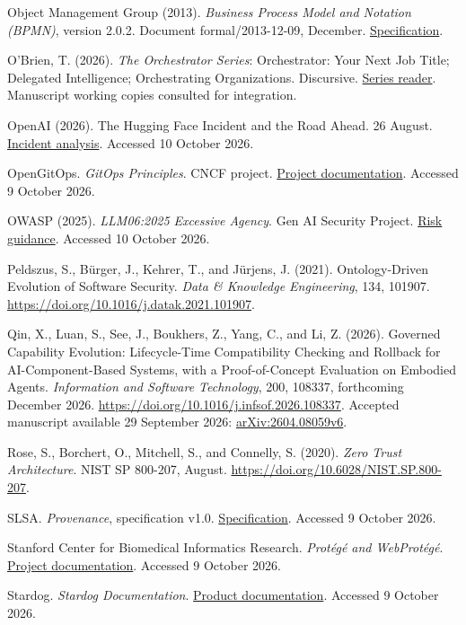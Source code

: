 \documentclass[preprint,12pt,authoryear]{elsarticle}
\begin{document}
Object Management Group (2013). \emph{Business Process Model and
Notation (BPMN)}, version 2.0.2. Document formal/2013-12-09, December.
\href{https://www.omg.org/spec/BPMN/2.0.2/PDF}{Specification}.

O'Brien, T. (2026). \emph{The Orchestrator Series}: Orchestrator: Your
Next Job Title; Delegated Intelligence; Orchestrating Organizations.
Discursive. \href{https://readorchestrator.com}{Series reader}.
Manuscript working copies consulted for integration.

OpenAI (2026). The Hugging Face Incident and the Road Ahead. 26 August.
\href{https://openai.com/index/hugging-face-incident-and-the-road-ahead/}{Incident
analysis}. Accessed 10 October 2026.

OpenGitOps. \emph{GitOps Principles}. CNCF project.
\href{https://opengitops.dev/}{Project documentation}. Accessed 9
October 2026.

OWASP (2025). \emph{LLM06:2025 Excessive Agency}. Gen AI Security
Project.
\href{https://genai.owasp.org/llmrisk/llm062025-excessive-agency/}{Risk
guidance}. Accessed 10 October 2026.

Peldszus, S., Bürger, J., Kehrer, T., and Jürjens, J. (2021).
Ontology-Driven Evolution of Software Security. \emph{Data \& Knowledge
Engineering}, 134, 101907.
\url{https://doi.org/10.1016/j.datak.2021.101907}.

Qin, X., Luan, S., See, J., Boukhers, Z., Yang, C., and Li, Z. (2026).
Governed Capability Evolution: Lifecycle-Time Compatibility Checking and
Rollback for AI-Component-Based Systems, with a Proof-of-Concept
Evaluation on Embodied Agents. \emph{Information and Software
Technology}, 200, 108337, forthcoming December 2026.
\url{https://doi.org/10.1016/j.infsof.2026.108337}. Accepted manuscript
available 29 September 2026:
\href{https://arxiv.org/abs/2604.08059v6}{arXiv:2604.08059v6}.

Rose, S., Borchert, O., Mitchell, S., and Connelly, S. (2020).
\emph{Zero Trust Architecture}. NIST SP 800-207, August.
\url{https://doi.org/10.6028/NIST.SP.800-207}.

SLSA. \emph{Provenance}, specification v1.0.
\href{https://slsa.dev/spec/v1.0/provenance}{Specification}. Accessed 9
October 2026.

Stanford Center for Biomedical Informatics Research. \emph{Protégé and
WebProtégé}. \href{https://protege.stanford.edu/software}{Project
documentation}. Accessed 9 October 2026.

Stardog. \emph{Stardog Documentation}.
\href{https://docs.stardog.com/}{Product documentation}. Accessed 9
October 2026.
\end{document}
